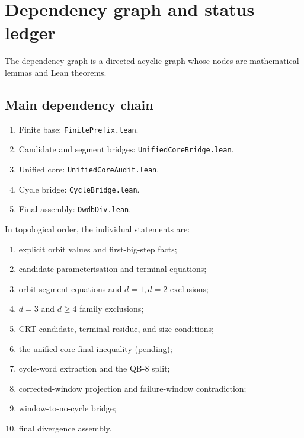 \section{Dependency graph and status ledger}

The dependency graph is a directed acyclic graph whose nodes are
mathematical lemmas and Lean theorems.

\subsection{Main dependency chain}

\begin{enumerate}[leftmargin=*]
\item Finite base:
  \texttt{FinitePrefix.lean}.
\item Candidate and segment bridges:
  \texttt{UnifiedCoreBridge.lean}.
\item Unified core:
  \texttt{UnifiedCoreAudit.lean}.
\item Cycle bridge:
  \texttt{CycleBridge.lean}.
\item Final assembly:
  \texttt{DwdbDiv.lean}.
\end{enumerate}

In topological order, the individual statements are:
\begin{enumerate}[leftmargin=*]
\item explicit orbit values and first-big-step facts;
\item candidate parameterisation and terminal equations;
\item orbit segment equations and $d=1,d=2$ exclusions;
\item $d=3$ and $d\ge4$ family exclusions;
\item CRT candidate, terminal residue, and size conditions;
\item the unified-core final inequality (pending);
\item cycle-word extraction and the QB-8 split;
\item corrected-window projection and failure-window contradiction;
\item window-to-no-cycle bridge;
\item final divergence assembly.
\end{enumerate}

